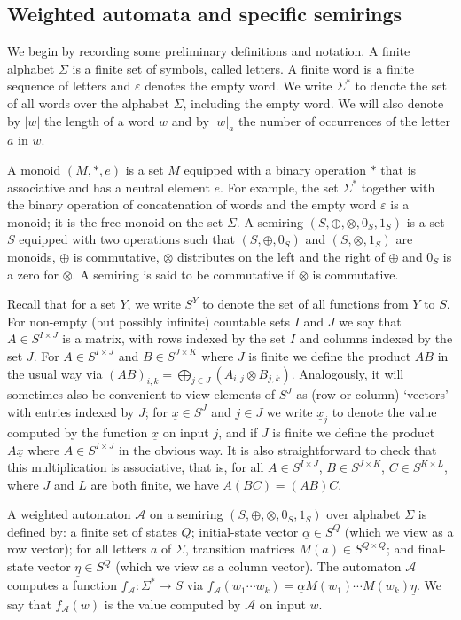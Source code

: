 \documentclass{lmcs}
\numberwithin{theorem}{section}
\begin{document}
\subsection{Weighted automata and specific semirings}
We begin by recording some preliminary definitions and notation. A finite alphabet $\Sigma$ is a finite set of symbols, called letters.  A finite word is a finite sequence of letters and $\varepsilon$ denotes the empty word. We write $\Sigma^*$ to denote the set of all words over the alphabet $\Sigma$, including the empty word. We will also denote by $|w|$ the length of a word $w$ and by $|w|_a$ the number of occurrences of the letter $a$ in $w$.

A monoid $(M,\ast,e)$ is a set $M$ equipped with a binary operation $\ast$ that is associative and has a neutral element $e$. For example, the set $\Sigma^*$ together with the binary operation of concatenation of words and the empty word $\varepsilon$ is a monoid; it is the free monoid on the set $\Sigma$. A semiring $(S,\oplus,\otimes,0_S,1_S)$ is a set $S$ equipped with two operations such that $(S,\oplus,0_S)$ and $(S,\otimes,1_S)$ are monoids, $\oplus$ is commutative, $\otimes$ distributes on the left and the right of $\oplus$ and $0_S$ is a zero for $\otimes$.  A semiring is said to be commutative if $\otimes$ is commutative.

Recall that for a set $Y$, we write $S^Y$ to denote the set of all functions from $Y$ to $S$. For non-empty (but possibly infinite) countable sets $I$ and $J$ we say that $A \in S^{I \times J}$ is a matrix, with rows indexed by the set $I$ and columns indexed by the set $J$. For $A \in S^{I \times J}$ and $B \in S^{J \times K}$ where $J$ is finite we define the product $AB$ in the usual way via $(AB)_{i,k} = \bigoplus_{j \in J}(A_{i,j}\otimes B_{j,k})$.  Analogously, it will sometimes also be convenient to view elements of $S^J$ as (row or column) `vectors' with entries indexed by $J$; for $\underline{x} \in S^J$ and $j \in J$ we write  $\underline{x}_j$ to denote the value computed by the function $\underline{x}$ on input $j$, and if $J$ is finite we define the product $A\underline{x}$ where $A \in S^{I \times J}$ in the obvious way. It is also straightforward to check that this multiplication is associative, that is, for all $A \in S^{I \times J}$, $B \in S^{J \times K}$, $C \in S^{K \times L}$, where $J$ and $L$ are both finite, we have $A(BC) = (AB)C$.

\begin{defi}
A weighted automaton $\mathcal{A}$ on a semiring $(S,\oplus,\otimes,0_S,1_S)$ over alphabet $\Sigma$ is defined by: a finite set of states $Q$; initial-state vector $\underline{\alpha} \in S^{Q}$ (which we view as a row vector); for all letters $a$ of $\Sigma$, transition matrices $M(a) \in S^{Q \times Q}$; and final-state vector $\underline{\eta} \in S^{Q}$ (which we view as a column vector). The automaton $\mathcal{A}$ computes a function $f_\mathcal{A} : \Sigma^* \rightarrow S$ via $f_\mathcal{A}(w_1 \cdots w_k) = \underline{\alpha} M(w_1)\cdots M(w_k)\underline{\eta}$. We say that $f_\mathcal{A} (w)$ is the value computed by $\mathcal{A}$ on input $w$. 
\end{defi}
\end{document}
